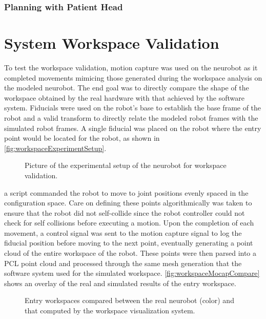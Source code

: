 \documentclass[12pt]{report}
\makeatletter
\renewcommand{\todo}[2][]{%
    \@todo[caption={#2}, #1]{\begin{spacing}{0.5}#2\end{spacing}}%
}
\makeatother
\begin{document}
\subsubsection{Planning with Patient Head}
\todo[inline]{Complete these tests and write section.}


\section{System Workspace Validation}
To test the workspace validation, motion capture was used on the neurobot as it completed movements mimicing those generated during the workspace analysis on the modeled neurobot. The end goal was to directly compare the shape of the workspace obtained by the real hardware with that achieved by the software system. Fiducials were used on the robot's base to establish the base frame of the robot and a valid transform to directly relate the modeled robot frames with the simulated robot frames. A single fiducial was placed on the robot where the entry point would be located for the robot, as shown in \autoref{fig:workspaceExperimentSetup}.

\begin{figure}[thpb]
	\centering
    \caption{Picture of the experimental setup of the neurobot for workspace validation.}
    \label{fig:workspaceExperimentSetup}
\end{figure}

a script commanded the robot to move to joint positions evenly spaced in the configuration space. Care on defining these points algorithmically was taken to ensure that the robot did not self-collide since the robot controller could not check for self collisions before executing a motion. Upon the completion of each movement, a control signal was sent to the motion capture signal to log the fiducial position before moving to the next point, eventually generating a point cloud of the entire workspace of the robot. These points were then parsed into a PCL point cloud and processed through the same mesh generation that the software system used for the simulated workspace. \autoref{fig:workspaceMocapCompare} shows an overlay of the real and simulated results of the entry workspace.

\begin{figure}[thpb]
	\centering
    \caption{Entry workspaces compared between the real neurobot (color) and that computed by the workspace visualization system.}
    \label{fig:workspaceMocapCompare}
\end{figure}
\end{document}
